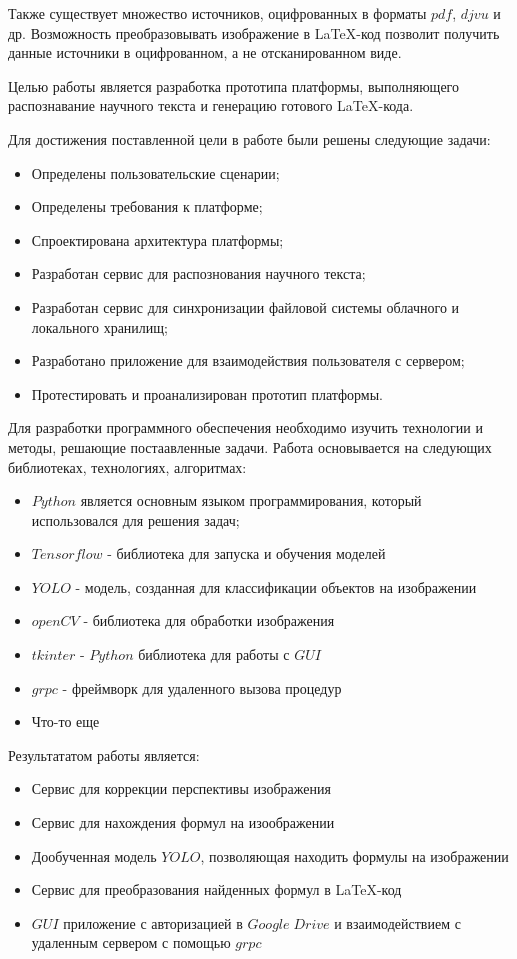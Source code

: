 Также существует множество источников, оцифрованных в форматы $pdf$, $djvu$ и др. Возможность преобразовывать изображение в \LaTeX-код позволит получить данные источники в оцифрованном, а не отсканированном виде.

Целью работы является разработка прототипа платформы, выполняющего распознавание научного текста и  генерацию готового \LaTeX-кода.

Для достижения поставленной цели в работе были решены следующие задачи:
\begin{itemize}
    \item Определены пользовательские сценарии;
    \item Определены требования к платформе;
    \item Спроектирована архитектура платформы;
    \item Разработан сервис для распознования научного текста;
    \item Разработан сервис для синхронизации файловой системы облачного и локального хранилищ;
    \item Разработано приложение для взаимодействия пользователя с сервером;
    \item Протестировать и проанализирован прототип платформы.
\end{itemize}

Для разработки программного обеспечения необходимо изучить технологии и методы, решающие постаавленные задачи. Работа основывается на следующих библиотеках, технологиях, алгоритмах:
\begin{itemize}
    \item $Python$ является основным языком программирования, который использовался для решения задач;
    \item $Tensorflow$ - библиотека для запуска и обучения моделей
    \item $YOLO$ - модель, созданная для классификации объектов на изображении
    \item $openCV$ - библиотека для обработки изображения
    \item $tkinter$ - $Python$ библиотека для работы с $GUI$
    \item $grpc$ - фреймворк для удаленного вызова процедур
    \item Что-то еще
\end{itemize}

Результататом работы является:
\begin{itemize}
    \item Сервис для коррекции перспективы изображения
    \item Сервис для нахождения формул на изоображении
    \item Дообученная модель $YOLO$, позволяющая находить формулы на изображении
    \item Сервис для преобразования найденных формул в \LaTeX-код
    \item $GUI$ приложение с авторизацией в $Google\; Drive$ и взаимодействием с удаленным сервером с помощью $grpc$
\end{itemize}